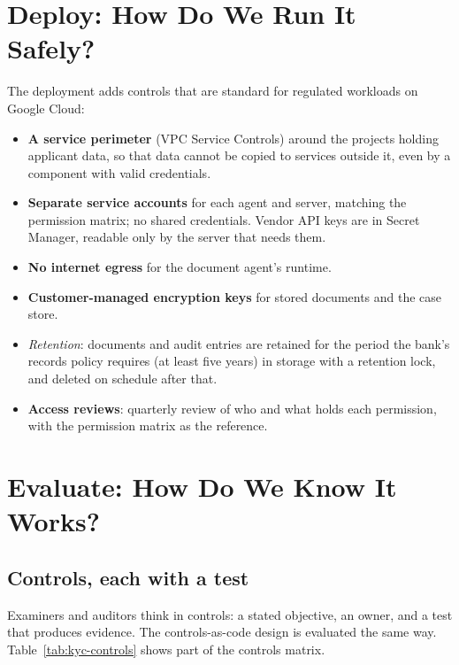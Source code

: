 \section{Deploy: How Do We Run It Safely?}
\label{sec:kyc-deploy}

The deployment adds controls that are standard for regulated workloads on Google Cloud:
\begin{itemize}[itemsep=1pt]
  \item \textbf{A service perimeter} (VPC Service Controls) around the projects holding applicant data, so that data cannot be copied to services outside it, even by a component with valid credentials.
  \item \textbf{Separate service accounts} for each agent and server, matching the permission matrix; no shared credentials. Vendor API keys are in Secret Manager, readable only by the server that needs them.
  \item \textbf{No internet egress} for the document agent's runtime.
  \item \textbf{Customer-managed encryption keys} for stored documents and the case store.
  \item \emph{Retention}: documents and audit entries are retained for the period the bank's records policy requires (at least five years) in storage with a retention lock, and deleted on schedule after that.
  \item \textbf{Access reviews}: quarterly review of who and what holds each permission, with the permission matrix as the reference.
\end{itemize}

\section{Evaluate: How Do We Know It Works?}
\label{sec:kyc-evaluate}

\subsection{Controls, each with a test}

Examiners and auditors think in controls: a stated objective, an owner, and a test that produces evidence. The controls-as-code design is evaluated the same way. Table~\ref{tab:kyc-controls} shows part of the controls matrix.

